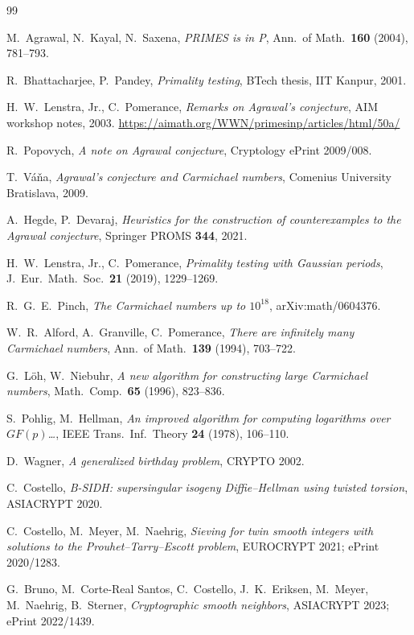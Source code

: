 \documentclass[11pt]{article}
\theoremstyle{remark}
\begin{document}
\begin{thebibliography}{99}\itemsep1pt\small

 M.~Agrawal, N.~Kayal, N.~Saxena, \emph{PRIMES is in P},
Ann.\ of Math.\ \textbf{160} (2004), 781--793.

 R.~Bhattacharjee, P.~Pandey, \emph{Primality testing}, BTech
thesis, IIT Kanpur, 2001.

 H.~W.~Lenstra, Jr., C.~Pomerance, \emph{Remarks on
Agrawal's conjecture}, AIM workshop notes, 2003.
\url{https://aimath.org/WWN/primesinp/articles/html/50a/}

 R.~Popovych, \emph{A note on Agrawal conjecture},
Cryptology ePrint 2009/008.

 T.~V\'a\v{n}a, \emph{Agrawal's conjecture and Carmichael
numbers}, Comenius University Bratislava, 2009.

 A.~Hegde, P.~Devaraj, \emph{Heuristics for the construction of
counterexamples to the Agrawal conjecture}, Springer PROMS \textbf{344}, 2021.

 H.~W.~Lenstra, Jr., C.~Pomerance, \emph{Primality testing
with Gaussian periods}, J.\ Eur.\ Math.\ Soc.\ \textbf{21} (2019), 1229--1269.

 R.~G.~E.~Pinch, \emph{The Carmichael numbers up to $10^{18}$},
arXiv:math/0604376.

 W.~R.~Alford, A.~Granville, C.~Pomerance, \emph{There are
infinitely many Carmichael numbers}, Ann.\ of Math.\ \textbf{139} (1994),
703--722.

 G.~L\"oh, W.~Niebuhr, \emph{A new algorithm for constructing
large Carmichael numbers}, Math.\ Comp.\ \textbf{65} (1996), 823--836.

 S.~Pohlig, M.~Hellman, \emph{An improved algorithm for
computing logarithms over $GF(p)$\dots}, IEEE Trans.\ Inf.\ Theory \textbf{24}
(1978), 106--110.

 D.~Wagner, \emph{A generalized birthday problem}, CRYPTO 2002.

 C.~Costello, \emph{B-SIDH: supersingular isogeny
Diffie--Hellman using twisted torsion}, ASIACRYPT 2020.

 C.~Costello, M.~Meyer, M.~Naehrig, \emph{Sieving for twin
smooth integers with solutions to the Prouhet--Tarry--Escott problem},
EUROCRYPT 2021; ePrint 2020/1283.

 G.~Bruno, M.~Corte-Real Santos, C.~Costello,
J.~K.~Eriksen, M.~Meyer, M.~Naehrig, B.~Sterner, \emph{Cryptographic smooth
neighbors}, ASIACRYPT 2023; ePrint 2022/1439.


\end{thebibliography}
\end{document}
